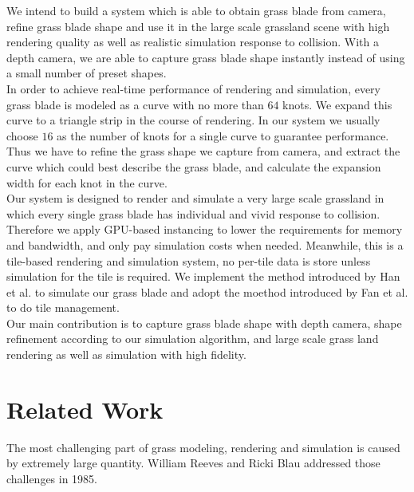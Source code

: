 \documentclass[10pt,journal,compsoc]{IEEEtran}
\begin{document}
We intend to build a system which is able to obtain grass blade from camera, refine grass blade shape and use it in the large scale grassland scene with high rendering quality as well as realistic simulation response to collision. With a depth camera, we are able to capture grass blade shape instantly instead of using a small number of preset shapes.\\

In order to achieve real-time performance of rendering and simulation, every grass blade is modeled as a curve with no more than $64$ knots. We expand this curve to a triangle strip in the course of rendering. In our system we usually choose $16$ as the number of knots for a single curve to guarantee performance. Thus we have to refine the grass shape we capture from camera, and extract the curve which could best describe the grass blade, and calculate the expansion width for each knot in the curve.\\

Our system is designed to render and simulate a very large scale grassland in which every single grass blade has individual and vivid response to collision. Therefore we apply GPU-based instancing to lower the requirements for memory and bandwidth, and only pay simulation costs when needed. Meanwhile, this is a tile-based rendering and simulation system, no per-tile data is store unless simulation for the tile is required. We implement the method introduced by Han et al.\cite{han2012real} to simulate our grass blade and adopt the moethod introduced by Fan et al.\cite{fan2015simulation} to do tile management.\\

Our main contribution is to capture grass blade shape with depth camera, shape refinement according to our simulation algorithm, and large scale grass land rendering as well as simulation with high fidelity.


\section{Related Work}
The most challenging part of grass modeling, rendering and simulation is caused by extremely large quantity. William Reeves and Ricki Blau\cite{reeves1985approximate} addressed those challenges in 1985.\\
\end{document}
